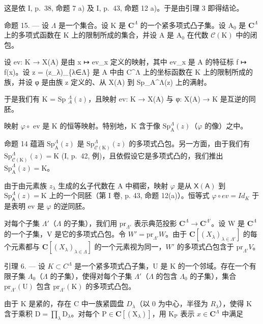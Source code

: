 这是依 I, p.~38, 命题 7 a) 及 I, p.~43, 命题 12 a)。于是由引理 3 即得结论。

命题 15. --- 设 \(\Lambda\) 是一个集合。设 K 是 \(\mathbf{C}^{\Lambda}\) 的一个紧多项式凸子集。设 \(\mathrm{A}_0\) 是 \(\mathbf{C}^{\Lambda}\) 上的多项式函数在 K 上的限制所成的集合，并设 A 是 \(\mathrm{A}_0\) 在代数 \(\mathcal{C}(\mathrm{K})\) 中的闭包。

设 ev: K → X(A) 是由 x ↦ ev\_x 定义的映射，其中 ev\_x 是 A 的特征标 f ↦ f(x)。设 z = (z\_λ)\_\{λ∈Λ\} 是 A 中由 C\^{}Λ 上的坐标函数在 K 上的限制所成的族，并设 φ 是由族 z 定义的、从 X(A) 到 Sp\_A\^{}Λ(z) 上的满射。

于是我们有 K = Sp \(_{A}^{\Lambda}(z)\)，且映射 ev: K → X(A) 与 φ: X(A) → K 是互逆的同胚。

映射 \(\varphi \circ\) ev 是 K 的恒等映射。特别地，K 含于像 \(\mathrm{Sp}_{\mathrm{A}}^{\Lambda}(z)\)（\(\varphi\) 的像）之中。

命题 14 蕴涵 \(\mathrm{Sp}_{\mathrm{A}}^{\Lambda}(z)\) 是 \(\mathrm{Sp}_{\mathcal{C}(\mathrm{K})}^{\Lambda}(z)\) 的多项式凸包。另一方面，由于我们有 \(\mathrm{Sp}_{\mathcal{C}(\mathrm{K})}^{\Lambda}(z) = \mathrm{K}\) (I, p.~42, 例)，且依假设它是多项式凸的，我们推出 \(\mathrm{Sp}_{\mathrm{A}}^{\Lambda}(z) = \mathrm{K}\)。

由于由元素族 \(z_{\lambda}\) 生成的幺子代数在 A 中稠密，映射 \(\varphi\) 是从 \(\mathsf{X}(\mathsf{A})\) 到 \(\mathrm{Sp}_{\mathsf{A}}^{\Lambda}(z)=\mathrm{K}\) 上的一个同胚（第 I 卷, p. 43, 命题 12(a)）。恒等式 \(\varphi\circ ev=Id_{K}\) 于是表明 ev 是 \(\varphi\) 的逆同胚。

对每个子集 \(\Lambda'\)（\(\Lambda\) 的子集），我们用 \(\mathrm{pr}_{\Lambda'}\) 表示典范投影 \(\mathbf{C}^{\Lambda} \to \mathbf{C}^{\Lambda'}\)。设 W 是 \(\mathbf{C}^{\Lambda}\) 的一个子集，V 是它的多项式凸包。令 \(W' = \mathrm{pr}_{\Lambda'} W\)。由于 \(\mathbf{C}[(X_{\lambda})_{\lambda \in \Lambda'}]\) 的每个元素都与 \(\mathbf{C}[(X_{\lambda})_{\lambda \in \Lambda}]\) 的一个元素视为同一，\(W'\) 的多项式凸包含于 \(\mathrm{pr}_{\Lambda'} V\)。

引理 6. --- 设 \(K \subset C^{\Lambda}\) 是一个紧多项式凸子集，U 是 K 的一个邻域。存在一个有限子集 \(\Lambda_{0}\)（\(\Lambda\) 的子集），使得对每个子集 \(\Lambda'\)（\(\Lambda\) 的包含 \(\Lambda_{0}\) 的子集），集合 \(\mathrm{pr}_{\Lambda'}(\mathrm{U})\) 包含 \(\mathrm{pr}_{\Lambda'}(\mathrm{K})\) 的多项式凸包。

由于 K 是紧的，存在 C 中一族紧圆盘 \(D_{\lambda}\)（以 0 为中心，半径为 \(R_{\lambda}\)），使得 K 含于乘积 \(\mathrm{D} = \prod_{\lambda} \mathrm{D}_{\lambda}\)。对每个 \(\mathrm{P} \in \mathbf{C}[(\mathrm{X}_{\lambda})]\)，用 \(\mathrm{K}_{\mathrm{P}}\) 表示 \(x \in \mathbf{C}^{\Lambda}\) 中满足

